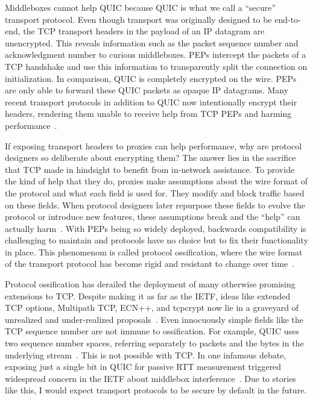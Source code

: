 Middleboxes cannot help QUIC because QUIC is what we call a ``secure'' transport
protocol. Even though transport was originally designed to be end-to-end, the
TCP transport headers in the payload of an IP datagram are unencrypted. This
reveals information such as the packet sequence number and acknowledgment
number to curious middleboxes. PEPs intercept the packets of a TCP handshake
and use this information to transparently split the connection on
initialization. In comparison, QUIC is completely encrypted on the wire. PEPs
are only able to forward these QUIC packets as opaque IP datagrams. Many recent
transport protocols in addition to QUIC now intentionally encrypt their
headers, rendering them unable to receive help from TCP PEPs and harming
performance~\cite{rfc8834webrtc,zoom,bittorrent,winstein2012mosh}.

If exposing transport headers to proxies can help performance, why are protocol
designers so deliberate about encrypting them? The answer lies in the sacrifice
that TCP made in hindsight to benefit from in-network assistance. To provide
the kind of help that they do, proxies make assumptions about the wire format
of the protocol and what each field is used for. They modify and block traffic
based on these fields. When protocol designers later repurpose these fields to
evolve the protocol or introduce new features, these assumptions break and the
``help'' can actually
harm~\cite{border2020quicsat-presentation,kuhn2021quic-over-sat,martin2022suitability,border2020evaluating,kosek2022quicpep}.
With PEPs being so widely deployed, backwards
compatibility is challenging to maintain and protocols have no choice but to
fix their functionality in place. This phenomenom is called protocol
ossification, where the wire format of the transport protocol has become
rigid and resistant to change over time~\cite{papastergiou2017deossifying, edeline2019bottomup}.

Protocol ossification has derailed the deployment of many otherwise promising
extensions to TCP. Despite making it as far as the IETF, ideas like
extended TCP options, Multipath TCP, ECN++, and tcpcrypt now lie in a graveyard
of unrealized and under-realized proposals~\cite{mandalari2018ecnplusplus,honda2011still,raiciu2012multipathtcp,rfc8548}.
Even innocuously simple fields like the TCP sequence
number are not immune to ossification. For example, QUIC uses two sequence
number spaces, referring separately to packets and the bytes in the underlying
stream~\cite{rfc9000}. This is not possible with TCP. In one infamous debate,
exposing just a single bit in QUIC for passive RTT measurement triggered
widespread concern in the IETF about middlebox interference~\cite{quicbit2018}.
Due to stories like this, I would expect transport protocols to be secure by default
in the future.

